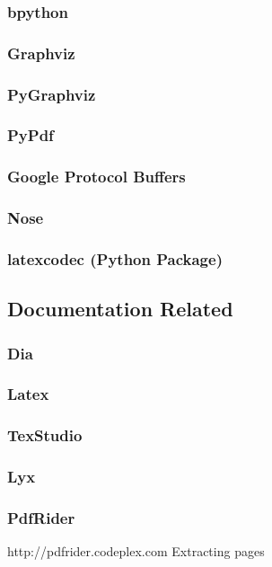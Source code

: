 \documentclass[a4paper,11pt]{report}
\begin{document}
\subsubsection*{bpython}
\subsubsection*{Graphviz}
\subsubsection*{PyGraphviz}
\subsubsection*{PyPdf}
\subsubsection*{Google Protocol Buffers}
\subsubsection*{Nose}
\subsubsection*{latexcodec (Python Package)}

\subsection{Documentation Related}
\subsubsection*{Dia}
\subsubsection*{Latex}
\subsubsection*{TexStudio}

\subsubsection*{Lyx}

\subsubsection*{PdfRider}
http://pdfrider.codeplex.com
Extracting pages
\end{document}
